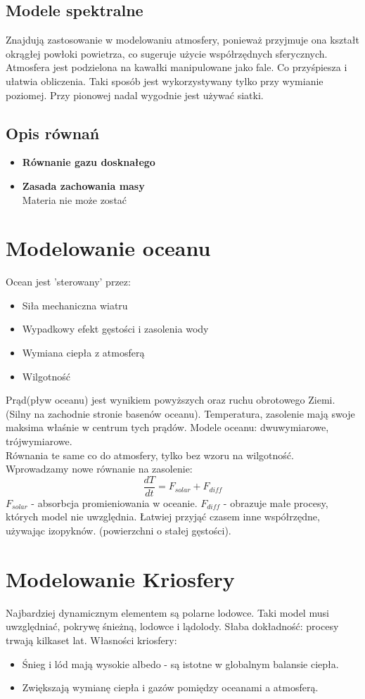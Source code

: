 \documentclass{article}
\theoremstyle{plain}
\begin{document}
\subsection{Modele spektralne}
	Znajdują zastosowanie w modelowaniu atmosfery, ponieważ przyjmuje ona kształt okrągłej powłoki powietrza, co sugeruje użycie współrzędnych sferycznych.
	Atmosfera jest podzielona na kawałki manipulowane jako fale. Co przyśpiesza i ułatwia obliczenia. Taki sposób jest wykorzystywany tylko przy wymianie poziomej. Przy pionowej nadal wygodnie jest używać siatki.  

\subsection{Opis równań}
\begin{itemize}
	\item \textbf{Równanie gazu dosknałego}
	\item \textbf{Zasada zachowania masy}\\
		Materia nie może zostać 
\end{itemize}


\section{Modelowanie oceanu}
	Ocean jest 'sterowany' przez:
	\begin{itemize}
		\item Siła mechaniczna wiatru
		\item Wypadkowy efekt gęstości i zasolenia wody
		\item Wymiana ciepła z atmosferą
		\item Wilgotność
	\end{itemize}
Prąd(pływ oceanu) jest wynikiem powyższych oraz ruchu obrotowego Ziemi.(Silny na zachodnie stronie basenów oceanu). Temperatura, zasolenie mają swoje maksima właśnie w centrum tych prądów. 
Modele oceanu: dwuwymiarowe, trójwymiarowe.\\
Równania te same co do atmosfery, tylko bez wzoru na wilgotność. Wprowadzamy nowe równanie na zasolenie:
\begin{equation}
	\frac{dT}{dt	} = F_{solar} + F_{diff}
\end{equation}
$F_{solar}$ - absorbcja promieniowania w oceanie. $F_{diff}$ - obrazuje małe procesy, których model nie uwzględnia.
Łatwiej przyjąć czasem inne współrzędne, używając izopyknów. (powierzchni o stałej gęstości).
\section{Modelowanie Kriosfery}
Najbardziej dynamicznym elementem są polarne lodowce. Taki model musi uwzględniać, pokrywę śnieżną, lodowce i lądolody. Słaba dokładność: procesy trwają kilkaset lat.
Własności kriosfery:
\begin{itemize}
	\item Śnieg i lód mają wysokie albedo - są istotne w globalnym balansie ciepła. 
	\item Zwiększają wymianę ciepła i gazów pomiędzy oceanami a atmosferą.
\end{itemize}
\end{document}
